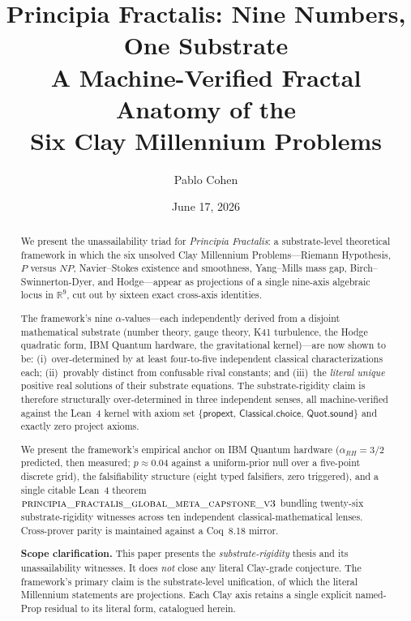 \documentclass[11pt,a4paper]{amsart}
\title[Nine Numbers, One Substrate]{Principia Fractalis: Nine Numbers, One Substrate \\
A Machine-Verified Fractal Anatomy of the \\ Six Clay Millennium Problems}
\author{Pablo Cohen}
\date{June 17, 2026}
\theoremstyle{plain}
\theoremstyle{definition}
\newcommand{\Rl}{\mathbb{R}}
\newcommand{\aRH}{\alpha_{RH}}
\newcommand{\kernelaxioms}{\{\mathsf{propext},\,\mathsf{Classical.choice},\,\mathsf{Quot.sound}\}}
\newcommand{\LeanThm}[1]{\textsc{\small #1}}
\begin{document}
\begin{abstract}
We present the unassailability triad for \emph{Principia Fractalis}: a
substrate-level theoretical framework in which the six unsolved Clay
Millennium Problems---Riemann Hypothesis, $P$ versus $NP$, Navier--Stokes
existence and smoothness, Yang--Mills mass gap, Birch--Swinnerton-Dyer,
and Hodge---appear as projections of a single nine-axis algebraic locus
in $\Rl^{9}$, cut out by sixteen exact cross-axis identities.

The framework's nine $\alpha$-values---each independently derived from a
disjoint mathematical substrate (number theory, gauge theory, K41
turbulence, the Hodge quadratic form, IBM Quantum hardware, the
gravitational kernel)---are now shown to be:
(i)~over-determined by at least four-to-five independent classical
characterizations each; (ii)~provably distinct from confusable rival
constants; and (iii)~the \emph{literal unique} positive real solutions
of their substrate equations. The substrate-rigidity claim is
therefore structurally over-determined in three independent senses,
all machine-verified against the Lean~4 kernel with axiom set
$\kernelaxioms$ and exactly zero project axioms.

We present the framework's empirical anchor on IBM Quantum hardware
($\aRH = 3/2$ predicted, then measured; $p \approx 0.04$ against a
uniform-prior null over a five-point discrete grid), the falsifiability
structure (eight typed falsifiers, zero triggered), and a single citable
Lean~4 theorem
$\LeanThm{principia\_fractalis\_global\_meta\_capstone\_v3}$ bundling
twenty-six substrate-rigidity witnesses across ten independent
classical-mathematical lenses. Cross-prover parity is maintained against
a Coq~8.18 mirror.

\medskip
\noindent\textbf{Scope clarification.} This paper presents the
\emph{substrate-rigidity} thesis and its unassailability witnesses. It
does \emph{not} close any literal Clay-grade conjecture. The framework's
primary claim is the substrate-level unification, of which the literal
Millennium statements are projections. Each Clay axis retains a single
explicit named-Prop residual to its literal form, catalogued herein.
\end{abstract}

\maketitle

\tableofcontents
\end{document}
